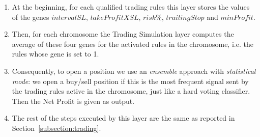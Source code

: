 \begin{enumerate}
\setlength\itemsep{0.3em}
\item At the beginning, for each qualified trading rules this layer stores the values of the genes $intervalSL$, $takeProfitXSL$, $risk\%$, $trailingStop$ and $minProfit$.
\item Then, for each chromosome the Trading Simulation layer computes the average of these four genes for the activated rules in the chromosome, i.e. the rules whose gene is set to 1.
\item Consequently, to open a position we use an \textit{ensemble} approach with \textit{statistical mode}: we open a buy/sell position if this is the most frequent signal sent by the trading rules active in the chromosome, just like a hard voting classifier. Then the Net Profit is given as output.
\item The rest of the steps executed by this layer are the same as reported in Section~\ref{subsection:trading}.
\end{enumerate}